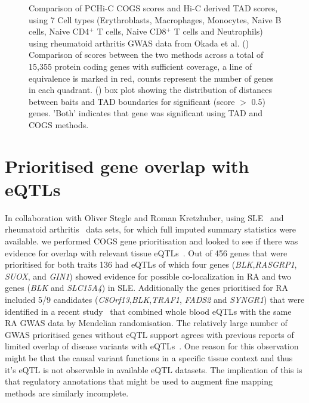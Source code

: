 \documentclass[a4paper,11pt]{report}
\begin{document}
\begin{figure}[h]
\begin{minipage}[t]{0.7\textwidth}
	\caption{Comparison of PCHi-C COGS scores and Hi-C derived TAD scores, using 7 Cell types (Erythroblasts, Macrophages, Monocytes, Naive B cells, Naive CD4$^{+}$ T cells, Naive CD8$^{+}$ T cells and Neutrophils) using rheumatoid arthritis GWAS data from Okada et al. 
	() Comparison of scores between the two methods across a total of 15,355 protein coding genes with sufficient coverage, a line of equivalence is marked in red, counts represent the number of genes in each quadrant. () box plot showing the distribution of distances between baits and TAD boundaries for significant (score $>$ 0.5)  genes. 'Both' indicates that gene was significant using TAD and COGS methods.}
\end{minipage}
\label{fig:blockshifter}
\end{figure}

\section{Prioritised gene overlap with eQTLs}
In collaboration with Oliver Stegle and Roman Kretzhuber, using SLE~\citep{Bentham2015-di} and rheumatoid arthritis~\citep{Okada2014-um} data sets, for which full imputed summary statistics were available. we performed COGS gene prioritisation and looked to see if there was evidence for overlap with relevant tissue eQTLs~\citep{FairfaxMakinoRadhakrishnanEtAl2012}.  Out of 456 genes that were prioritised for both traits 136 had eQTLs  of which four genes (\textit{BLK},\textit{RASGRP1}, \textit{SUOX}, and \textit{GIN1}) showed evidence for possible co-localization in RA and two genes (\textit{BLK} and \textit{SLC15A4}) in SLE. Additionally the genes prioritised for RA included 5/9 candidates (\textit{C8Orf13},\textit{BLK},\textit{TRAF1}, \textit{FADS2} and \textit{SYNGR1}) that were identified in a recent study~\citep{ZhuZhangHuEtAl2016} that combined whole blood eQTLs with the same RA GWAS data by Mendelian randomisation. The relatively large number of GWAS prioritised genes without eQTL support  agrees with previous reports of limited overlap of disease variants with eQTLs~\citep{Guo2015-ka,HuangChenEsparzaEtAl2015}. One reason for this observation might be that the causal variant functions in a specific tissue context and thus it's eQTL is not observable in available eQTL datasets. The implication of this is that regulatory annotations that might be used to augment fine mapping methods are similarly incomplete. 
\end{document}
